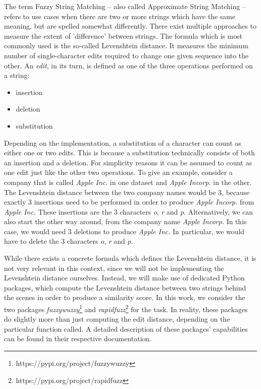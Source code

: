 The term Fuzzy String Matching -- also called Approximate String Matching -- refers to use cases when there are two or more strings which have the same meaning, but are spelled somewhat differently. There exist multiple approaches to measure the extent of 'difference' between strings. The formula which is most commonly used is the so-called Levenshtein distance. It measures the minimum number of single-character edits required to change one given sequence into the other. An \textit{edit}, in its turn, is defined as one of the three operations performed on a string: 
\begin{itemize}
	\item insertion
	\item deletion
	\item substitution
\end{itemize}
Depending on the implementation, a substitution of a character can count as either one or two edits. This is because a substitution technically consists of both an insertion and a deletion. For simplicity reasons it can be assumed to count as one edit just like the other two operations. To give an example, consider a company that is called \textit{Apple Inc.} in one dataset and \textit{Apple Incorp.} in the other. The Levenshtein distance between the two company names would be 3, because exactly 3 insertions need to be performed in order to produce \textit{Apple Incorp.} from \textit{Apple Inc.} These insertions are the 3 characters \textit{o}, \textit{r} and \textit{p}. Alternatively, we can also start the other way around, from the company name \textit{Apple Incorp.} In this case, we would need 3 deletions to produce \textit{Apple Inc.} In particular, we would have to delete the 3 characters \textit{o}, \textit{r} and \textit{p}. 

While there exists a concrete formula which defines the Levenshtein distance, it is not very relevant in this context, since we will not be implementing the Levenshtein distance ourselves. 
Instead, we will make use of dedicated Python packages, which compute the Levenshtein distance between two strings behind the scenes in order to produce a similarity score. In this work, we consider the two packages \textit{fuzzywuzzy}\footnote{https://pypi.org/project/fuzzywuzzy} and \textit{rapidfuzz}\footnote{https://pypi.org/project/rapidfuzz} for the task. In reality, these packages do slightly more than just computing the edit distance, depending on the particular function called. A detailed description of these packages' capabilities can be found in their respective documentation. 

